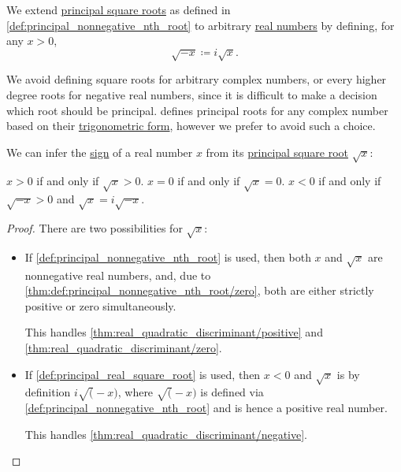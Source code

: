 \begin{definition}\label{def:principal_real_square_root}\mimprovised
  We extend \hyperref[def:nth_root]{principal square roots} as defined in \cref{def:principal_nonnegative_nth_root} to arbitrary \hyperref[def:real_numbers]{real numbers} by defining, for any \( x > 0 \),
  \begin{equation}\label{eq:def:principal_real_square_root/negative}
    \sqrt {-x} \coloneqq i \sqrt x.
  \end{equation}
\end{definition}
\begin{comments}
  \item We avoid defining square roots for arbitrary complex numbers, or every higher degree roots for negative real numbers, since it is difficult to make a decision which root should be principal.  defines principal roots for any complex number based on their \hyperref[def:complex_numbers_trigonometric_form]{trigonometric form}, however we prefer to avoid such a choice.
\end{comments}

\begin{proposition}\label{thm:principal_real_square_root_sign}
  We can infer the \hyperref[def:signum]{sign} of a real number \( x \) from its \hyperref[def:principal_real_square_root]{principal square root} \( \sqrt x \):
  \begin{thmenum}
     \( x > 0 \) if and only if \( \sqrt x > 0 \).
     \( x = 0 \) if and only if \( \sqrt x = 0 \).
     \( x < 0 \) if and only if \( \sqrt{-x} > 0 \) and \( \sqrt x = i \sqrt{-x} \).
  \end{thmenum}
\end{proposition}
\begin{proof}
  There are two possibilities for \( \sqrt x \):
  \begin{itemize}
    \item If \cref{def:principal_nonnegative_nth_root} is used, then both \( x \) and \( \sqrt x \) are nonnegative real numbers, and, due to \cref{thm:def:principal_nonnegative_nth_root/zero}, both are either strictly positive or zero simultaneously.

    This handles \cref{thm:real_quadratic_discriminant/positive} and \cref{thm:real_quadratic_discriminant/zero}.

    \item If \cref{def:principal_real_square_root} is used, then \( x < 0 \) and \( \sqrt x \) is by definition \( i \sqrt (-x) \), where \( \sqrt (-x) \) is defined via \cref{def:principal_nonnegative_nth_root} and is hence a positive real number.

    This handles \cref{thm:real_quadratic_discriminant/negative}.
  \end{itemize}
\end{proof}

